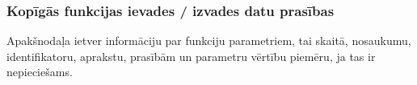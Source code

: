 \subsubsection{Kopīgās funkcijas ievades / izvades datu prasības}
Apakšnodaļa ietver informāciju par funkciju parametriem, tai skaitā, nosaukumu, identifikatoru, aprakstu, prasībām un parametru vērtību piemēru, ja tas ir nepieciešams.

\setlength{\parindent}{0pt}


\setlength{\parindent}{1cm}
